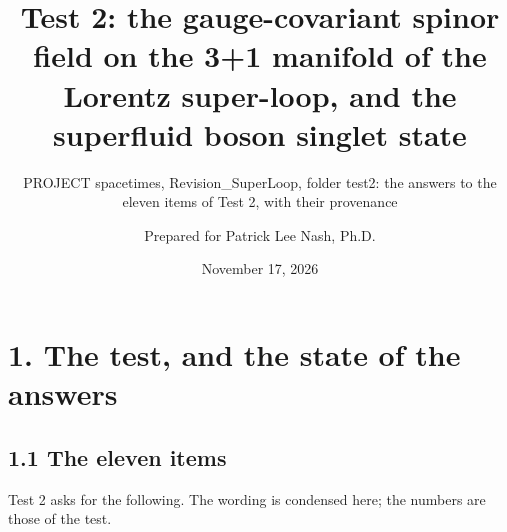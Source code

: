 \documentclass[
  10pt,
]{article}
\title{Test 2: the gauge-covariant spinor field on the 3+1 manifold of
the Lorentz super-loop, and the superfluid boson singlet state}
\subtitle{PROJECT spacetimes, Revision\_SuperLoop, folder test2: the
answers to the eleven items of Test 2, with their provenance}
\author{Prepared for Patrick Lee Nash, Ph.D.}
\date{November 17, 2026}
\begin{document}
\maketitle

\hypertarget{the-test-and-the-state-of-the-answers}{%
\section{1. The test, and the state of the
answers}\label{the-test-and-the-state-of-the-answers}}

\hypertarget{the-eleven-items}{%
\subsection{1.1 The eleven items}\label{the-eleven-items}}

Test 2 asks for the following. The wording is condensed here; the
numbers are those of the test.
\end{document}
